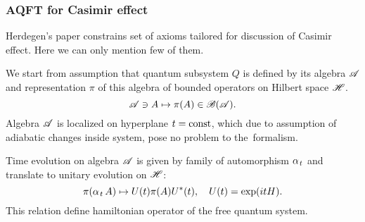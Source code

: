 \documentclass[10pt,t]{beamer}
\begin{document}
\begin{frame}
  \frametitle{AQFT for Casimir effect}


  Herdegen's paper
  \parencite{Herdegen-Quantum-backreaction-ETC-Part-I-Pub-2005}
  constrains set of axioms tailored for discussion of Casimir effect.
  Here we can only mention few of them.

  We start from assumption that quantum subsystem $Q$ is defined by its
  algebra $\mathcal{A}$ and representation $\pi$ of this algebra of bounded
  operators on Hilbert space $\mathcal{H}$.
  \begin{equation}
    \label{eq:Overview-of-Herdegens-approach-ETC-07}
    \mathcal{A} \ni A \mapsto \pi( A ) \in \mathcal{B}( \mathcal{A} ).
  \end{equation}
  Algebra $\mathcal{A}$ is localized on hyperplane $t = \textrm{const}$, which due to
  assumption of adiabatic changes inside system, pose no problem to
  the~formalism.

  Time evolution on algebra $\mathcal{A}$ is given by family of automorphism
  $\alpha_{ \hspace{0.09em} t }$ and translate to unitary evolution on $\mathcal{H}$:
  \begin{equation}
    \label{eq:Overview-of-Herdegens-approach-ETC-07}
    \pi( \alpha_{ \hspace{0.09em} t } \, A ) \mapsto U( t ) \pi( A ) U^{ * }( t ), \quad
    U( t ) = \exp( i t H ).
  \end{equation}
  This relation define hamiltonian operator of the free quantum system.

\end{frame}
\end{document}
